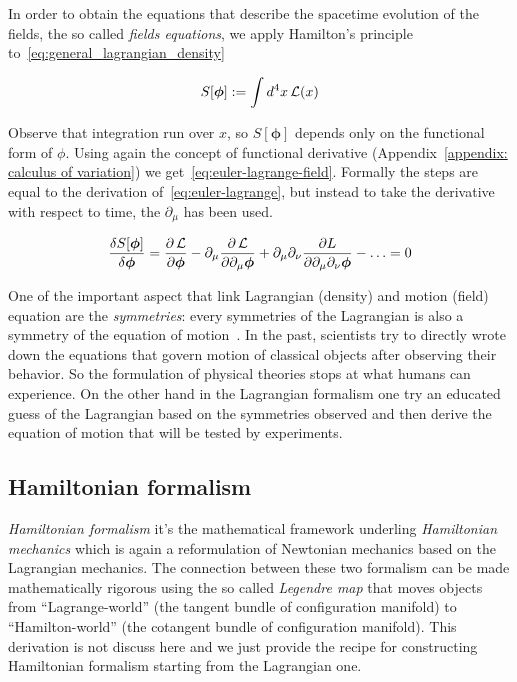 In order to obtain the equations that describe the spacetime evolution of the
fields, the so called \emph{fields equations}, we apply Hamilton's principle
to~\eqref{eq:general_lagrangian_density}

\begin{equation} \label{eq:general_action_fields}
  S[\bm{\phi}] := \int d^4x \operatorname{\mathcal{L}}(x)
\end{equation}

Observe that integration run over $x$, so $S[\bm{\phi}]$ depends only on the
functional form of $\phi$. Using again the concept of functional derivative
(Appendix~\ref{appendix: calculus of variation}) we
get~\eqref{eq:euler-lagrange-field}. Formally the steps are equal to the
derivation of~\eqref{eq:euler-lagrange}, but instead to take the derivative with
respect to time, the $\partial_{\mu}$ has been used.

\begin{equation} \label{eq:euler-lagrange-field}
  \frac{\delta S[\bm{\phi}]}{\delta \bm{\phi}} =
    \frac{\partial \operatorname{\mathcal{L}}}{\partial \bm{\phi}} -
    \partial_{\mu} \frac{\partial \operatorname{\mathcal{L}}}{\partial \partial_{\mu}\bm{\phi}} +
    \partial_{\mu}\partial_{\nu}\frac{\partial L}
    {\partial \partial_{\mu}\partial_{\nu}\bm{\phi}} -
    \ldots = 0
\end{equation}

One of the important aspect that link Lagrangian (density) and motion (field)
equation are the \emph{symmetries}: every symmetries of the Lagrangian is also a
symmetry of the equation of motion~\cite{Aldrovandi19_symmetry}. In the past,
scientists try to directly wrote down the equations that govern motion of
classical objects after observing their behavior. So the formulation of physical
theories stops at what humans can experience. On the other hand in the
Lagrangian formalism one try an educated guess of the Lagrangian based on the
symmetries observed and then derive the equation of motion that will be tested
by experiments.


\subsection{Hamiltonian formalism}\label{subsection: hamiltonian_formalism}
\emph{Hamiltonian formalism} it's the mathematical framework underling
\emph{Hamiltonian mechanics} which is again a reformulation of Newtonian
mechanics based on the Lagrangian mechanics. The connection between these two
formalism can be made mathematically rigorous using the so called \emph{Legendre
map} that moves objects from ``Lagrange-world'' (the tangent bundle of
configuration manifold) to ``Hamilton-world'' (the cotangent bundle of
configuration manifold). This derivation is not discuss here and we just
provide the recipe for constructing Hamiltonian formalism starting from the
Lagrangian one.

